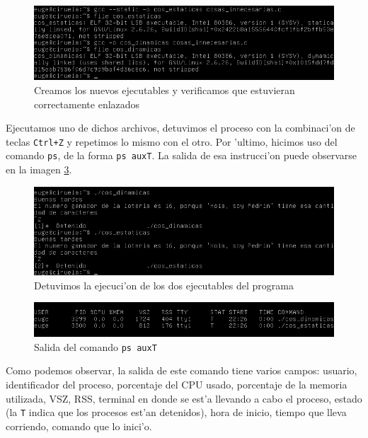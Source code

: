 \documentclass[11pt]{article}
\begin{document}
		\begin{figure}[H]
    			\centering \captionsetup{justification=centering}
    			\includegraphics[scale=0.65]{Images/Seccion 1/innecesario.png}
    			\caption{Creamos los nuevos ejecutables y verificamos que estuvieran correctamente enlazados}
    			\label{fig:innecesario}
		\end{figure}

		Ejecutamos uno de dichos archivos, detuvimos el proceso con la combinaci'on de teclas \texttt{Ctrl+Z} y repetimos lo mismo con el otro. Por 'ultimo, hicimos uso del comando \texttt{ps}, de la forma \texttt{ps auxT}. La salida de esa instrucci'on puede observarse en la imagen \ref{fig:ps}.

		\begin{figure}[H]
    			\centering
    			\includegraphics[scale=0.65]{Images/Seccion 1/detenidos.png}
    			\caption{Detuvimos la ejecuci'on de los dos ejecutables del programa}
    			\label{fig:detenidos}
		\end{figure}

		\begin{figure}[H]
    			\centering
    			\includegraphics[scale=0.65]{Images/Seccion 1/ps_.png}
    			\caption{Salida del comando \texttt{ps auxT}}
    			\label{fig:ps}
		\end{figure}

		Como podemos observar, la salida de este comando tiene varios campos: usuario, identificador del proceso, porcentaje del CPU usado, porcentaje de la memoria utilizada, VSZ, RSS, terminal en donde se est'a llevando a cabo el proceso, estado (la \texttt{T} indica que los procesos est'an detenidos), hora de inicio, tiempo que lleva corriendo, comando que lo inici'o.
\end{document}
